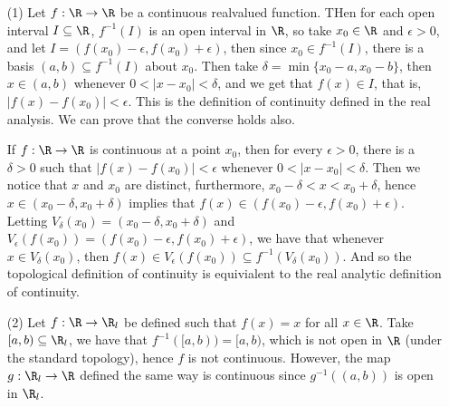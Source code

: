 \begin{example}
    \begin{enumerate}
        \item[(1)] Let $f:\R \rightarrow \R$ be a continuous realvalued function.
            THen for each open interval  $I \subseteq \R$,  $f^{-1}(I)$ is an
            open interval in  $\R$, so take  $x_0 \in \R$ and $\epsilon>0$, and
            let $I=(f(x_0)-\epsilon,f(x_0)+\epsilon)$, then since $ x_0 \in
            f^{-1}(I)$, there is a basis $(a,b) \subseteq f^{-1}(I)$ about
            $x_0$. Then take  $\delta=\min\{x_0-a,x_0-b\}$, then $x \in (a,b)$
            whenever $0<|x-x_0|<\delta$, and we get that $f(x) \in I$, that is,
            $|f(x)-f(x_0)|<\epsilon$. This is the definition of continuity
            defined in the real analysis. We can prove that the converse holds
            also.

            If $f:\R \rightarrow \R$ is continuous at a point $x_0$, then for
            every $\epsilon>0$, there is a  $\delta>0$ such that
            $|f(x)-f(x_0)|<\epsilon$ whenever $0<|x-x_0|<\delta$. Then we notice
            that $x$ and  $ x_0$ are distinct, furthermore, $x_0-\delta<x
            <x_0+\delta$, hence $x \in (x_0-\delta,x_0+\delta)$ implies that
            $f(x) \in (f(x_0)-\epsilon,f(x_0)+\epsilon)$. Letting
            $V_{\delta}(x_0)=(x_0-\delta,x_0+\delta) $ and
            $V_{\epsilon}(f(x_0))=(f(x_0)-\epsilon,f(x_0)+\epsilon)$, we have
            that whenever  $x \in V_{\delta}(x_0)$, then $f(x) \in
            V_{\epsilon}(f(x_0)) \subseteq f^{-1}(V_{\delta}(x_0))$. And so the
            topological definition of continuity is equivialent to the real
            analytic definition of continuity.

        \item[(2)] Let $f:\R \rightarrow \R_l$ be defined such that  $f(x)=x$ for all
            $x \in \R$. Take  $[a,b) \subseteq \R_l$, we have that
            $f^{-1}([a,b))=[a,b)$, which is not open in  $\R$  (under the
            standard topology), hence $f$ is not continuous. However, the map
            $g:\R_l \rightarrow \R$ defined the same way is continuous since
            $g^{-1}((a,b))$ is open in  $\R_l$.
    \end{enumerate}
\end{example}

